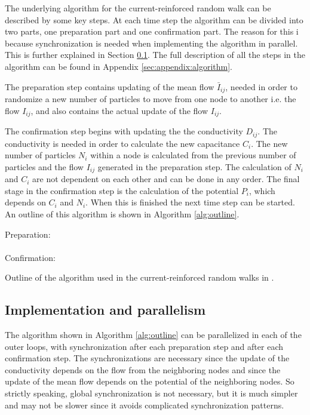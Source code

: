 The underlying algorithm for the current-reinforced random walk can be described by some key steps. At each time step the algorithm can be divided into two parts, one preparation part and one confirmation part. The reason for this i because synchronization is needed when implementing the algorithm in parallel. This is further explained in Section \ref{sec:parallel}. The full description of all the steps in the algorithm can be found in Appendix \ref{sec:appendix:algorithm}. 

The preparation step contains updating of the mean flow $\bar{I}_{ij}$, needed in order to randomize a new number of particles to move from one node to another i.e. the flow $I_{ij}$, and also contains the actual update of the flow $I_{ij}$.

The confirmation step begins with updating the the conductivity $D_{ij}$. The conductivity is needed in order to calculate the new capacitance $C_{i}$. The new number of particles $N_{i}$ within a node is calculated from the previous number of particles and the flow $I_{ij}$ generated in the preparation step. The calculation of $N_{i}$ and $C_{i}$ are not dependent on each other and can be done in any order. The final stage in the confirmation step is the calculation of the potential $P_{i}$, which depends on $C_{i}$ and $N_{i}$. When this is finished the next time step can be started. An outline of this algorithm is shown in Algorithm \ref{alg:outline}.

\begin{algorithm}[H]
Preparation:\\
\ \\
Confirmation:\\
\caption{Outline of the algorithm used in the current-reinforced random walks in \cite{Sumpter}.}
\label{alg:outline}
\end{algorithm}

\subsection{Implementation and parallelism} 
\label{sec:parallel}

The algorithm shown in Algorithm \ref{alg:outline} can be parallelized in each of the outer loops, with synchronization after each preparation step and after each confirmation step. The synchronizations are necessary since the update of the conductivity depends on the flow from the neighboring nodes and since the update of the mean flow depends on the potential of the neighboring nodes. So strictly speaking, global synchronization is not necessary, but it is much simpler and may not be slower since it avoids complicated synchronization patterns.


